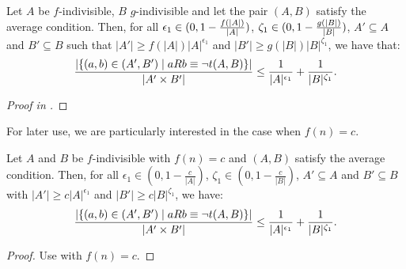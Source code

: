         \begin{lemma} \label{lem:exceptions_bound_of_f_indivisible_sets}
            Let $A$ be $f$-indivisible, $B$ $g$-indivisible and let the pair $(A,B)$ satisfy the average condition.
            Then, for all $\epsilon_1 \in ( 0, 1-\frac{f(|A|)}{|A|} )$, $\zeta_1 \in ( 0, 1-\frac{g(|B|)}{|B|} )$, $A' \subseteq A$
                and $B' \subseteq B$ such that $|A'| \geq f(|A|) |A|^{\epsilon_1}$ and $|B'| \geq g(|B|) |B|^{\zeta_1}$,
                we have that:
            \[
                \frac{|\{ (a,b) \in (A',B') \mid a R b \equiv \neg t(A,B) \}|}{|A' \times B'|} \leq
                    \frac{1}{|A|^{\epsilon_1}} + \frac{1}{|B|^{\zeta_1}}.
            \]
            \begin{proof}[Proof in ]
            \end{proof}
        \end{lemma}

        For later use, we are particularly interested in the case when $f(n) = c$.

        \begin{corollary} \label{cor:exceptions_bound_of_c_indivisible_sets}
            Let $A$ and $B$ be $f$-indivisible with $f(n) = c$ and $(A,B)$ satisfy the average condition.
            Then, for all $\epsilon_1 \in (0, 1 - \frac{c}{|A|})$, $\zeta_1 \in (0, 1 - \frac{c}{|B|})$, $A' \subseteq A$ and
            $B' \subseteq B$ with $|A'| \geq c |A|^{\epsilon_1}$ and $|B'| \geq c |B|^{\zeta_1}$, we have:
            \[
                \frac{|\{ (a,b) \in (A',B') \mid a R b \equiv \neg t(A,B) \}|}{|A' \times B'|} \leq
                    \frac{1}{|A|^{\epsilon_1}} + \frac{1}{|B|^{\zeta_1}}.
            \]
            \begin{proof}
                Use  with $f(n) = c$.
            \end{proof}
        \end{corollary}

